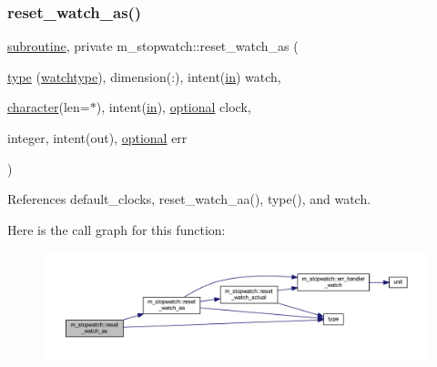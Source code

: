 \subsubsection{\texorpdfstring{reset\+\_\+watch\+\_\+as()}{reset\_watch\_as()}}
{\footnotesize\ttfamily \hyperlink{M__stopwatch_83_8txt_acfbcff50169d691ff02d4a123ed70482}{subroutine}, private m\+\_\+stopwatch\+::reset\+\_\+watch\+\_\+as (\begin{DoxyParamCaption}\item[{\hyperlink{stop__watch_83_8txt_a70f0ead91c32e25323c03265aa302c1c}{type} (\hyperlink{structm__stopwatch_1_1watchtype}{watchtype}), dimension(\+:), intent(\hyperlink{M__journal_83_8txt_afce72651d1eed785a2132bee863b2f38}{in})}]{watch,  }\item[{\hyperlink{option__stopwatch_83_8txt_abd4b21fbbd175834027b5224bfe97e66}{character}(len=$\ast$), intent(\hyperlink{M__journal_83_8txt_afce72651d1eed785a2132bee863b2f38}{in}), \hyperlink{option__stopwatch_83_8txt_aa4ece75e7acf58a4843f70fe18c3ade5}{optional}}]{clock,  }\item[{integer, intent(out), \hyperlink{option__stopwatch_83_8txt_aa4ece75e7acf58a4843f70fe18c3ade5}{optional}}]{err }\end{DoxyParamCaption})\hspace{0.3cm}{\ttfamily [private]}}



References default\+\_\+clocks, reset\+\_\+watch\+\_\+aa(), type(), and watch.

Here is the call graph for this function\+:
\nopagebreak
\begin{figure}[H]
\begin{center}
\leavevmode
\includegraphics[width=350pt]{namespacem__stopwatch_a05ff195ab84cacf71bbb2c646c562888_cgraph}
\end{center}
\end{figure}
\mbox{\label{namespacem__stopwatch_aeeaefcdbbde78f813b93212704a46ce2}} 

